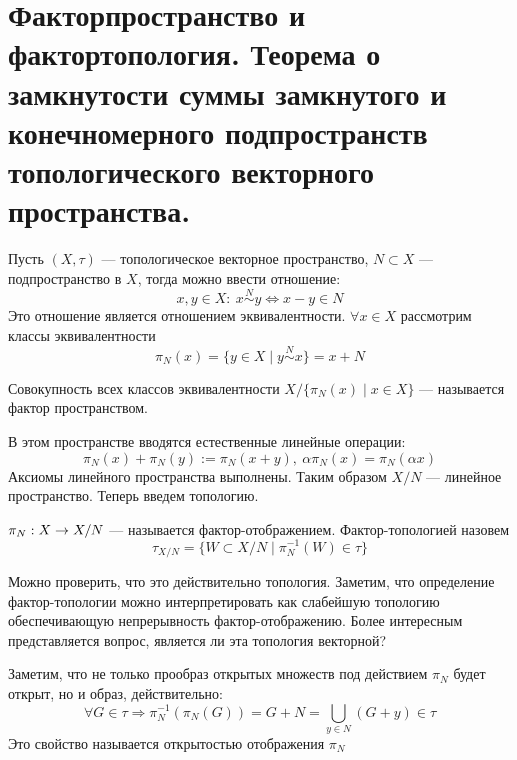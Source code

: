 \newpage
\section{Факторпространство и фактортопология. Теорема о замкнутости суммы замкнутого и конечномерного подпространств топологического векторного пространства.}

Пусть $(X, \tau)$ --- топологическое векторное пространство, $N \subset X$ --- подпространство в $X$, тогда можно ввести отношение: 
$$
x, y \in X: \ x \stackrel{N}{\sim} y \Leftrightarrow x - y \in N
$$
Это отношение является отношением эквивалентности. 
$\forall x \in X$ рассмотрим классы эквивалентности
$$
\pi_N(x) = \{ y \in X \mid y \stackrel{N}{\sim} x\} = x + N
$$
\begin{definition}\label{def:fac}
	Совокупность всех классов эквивалентности $X / \{\pi_N(x) \mid x \in X\}$ --- называется фактор пространством.
\end{definition}
В этом пространстве вводятся естественные линейные операции:
$$
\pi_N(x) + \pi_N(y) := \pi_N(x+y), \ \alpha \pi_N(x) = \pi_N(\alpha x)
$$
Аксиомы линейного пространства выполнены. Таким образом $X / N$ --- линейное пространство. Теперь введем топологию.
\begin{definition}
	$\pi_N: X \rightarrow X / N$ --- называется фактор-отображением. Фактор-топологией назовем
	$$
	\tau_{X / N} = \{ W \subset X / N \mid \pi_N^{-1}(W) \in \tau\}
	$$
\end{definition}
Можно проверить, что это действительно топология. Заметим, что определение фактор-топологии можно интерпретировать как слабейшую топологию обеспечивающую непрерывность фактор-отображению. Более интересным представляется вопрос, является ли эта топология векторной?

Заметим, что не только прообраз открытых множеств под действием $\pi_N$ будет открыт, но и образ, действительно:
$$
\forall G \in \tau  \Rightarrow \pi_N^{-1}(\pi_N(G)) = G + N = \bigcup_{y \in N }(G + y) \in \tau
$$
Это свойство называется открытостью отображения $\pi_N$

